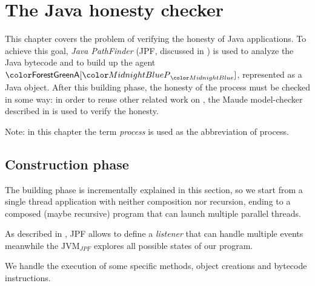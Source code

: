 
\chapter{The Java honesty checker}\label{chap:java-honesty}

This chapter covers the problem of verifying the honesty of Java applications.
To achieve this goal, \textit{Java PathFinder} (JPF, discussed in ) is used to analyze the Java bytecode and to build up the agent $\sys{\pmv{A}}{\procP}$, represented as a Java object.
After this building phase, the honesty of the process must be checked in some way: in order to reuse other related work on \coco, the Maude model-checker described in  is used to verify the honesty.

Note: in this chapter the term \textit{process} is used as the abbreviation of \coco process.

\section{Construction phase}\label{sec:construction-phase}
The building phase is incrementally explained in this section, so we start from a single thread application with neither composition nor recursion, ending to a composed (maybe recursive) program that can launch multiple parallel threads.

As described in , JPF allows to define a \emph{listener} that can handle multiple events meanwhile the $\text{JVM}_{JPF}$ explores all possible states of our program. 

We handle the execution of some specific methods, object creations and bytecode instructions.


